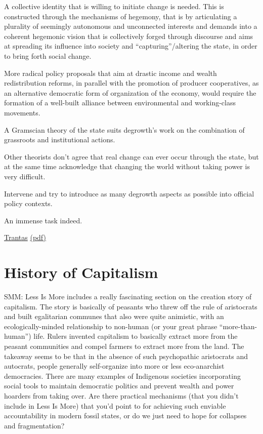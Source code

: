 \documentclass[
]{book}
\begin{document}
A collective identity that is willing to initiate change is needed. This is
constructed through the mechanisms of hegemony, that is by
articulating a plurality of seemingly autonomous and unconnected interests and demands into a coherent
hegemonic vision that is collectively forged through discourse and aims at spreading its influence into society
and ``capturing''/altering the state, in order to bring forth social change.

More radical policy proposals that aim at drastic income and wealth
redistribution reforms, in parallel with the promotion of producer cooperatives, as an alternative democratic
form of organization of the economy, would require the formation of a well-built alliance between
environmental and working-class movements.

A Gramscian theory of the state suits degrowth's work on the combination of grassroots and institutional actions.

Other theorists don't agree that real change can ever occur through the state, but at the same time
acknowledge that changing the world without taking power is very difficult.

Intervene and try to
introduce as many degrowth aspects as possible into official policy contexts.

An immense task indeed.

\href{https://journals.librarypublishing.arizona.edu/jpe/article/id/2362/}{Trantas}
\href{pdf/Trantas_2021_Degrowth_vs_Sustainable.pdf}{(pdf)}

\hypertarget{history-of-capitalism}{%
\chapter{History of Capitalism}\label{history-of-capitalism}}

SMM: Less Is More includes a really fascinating section on the creation story of capitalism. The story is basically of peasants who threw off the rule of aristocrats and built egalitarian communes that also were quite animistic, with an ecologically-minded relationship to non-human (or your great phrase ``more-than-human'') life. Rulers invented capitalism to basically extract more from the peasant communities and compel farmers to extract more from the land. The takeaway seems to be that in the absence of such psychopathic aristocrats and autocrats, people generally self-organize into more or less eco-anarchist democracies. There are many examples of Indigenous societies incorporating social tools to maintain democratic politics and prevent wealth and power hoarders from taking over. Are there practical mechanisms (that you didn't include in Less Is More) that you'd point to for achieving such enviable accountability in modern fossil states, or do we just need to hope for collapses and fragmentation?
\end{document}
